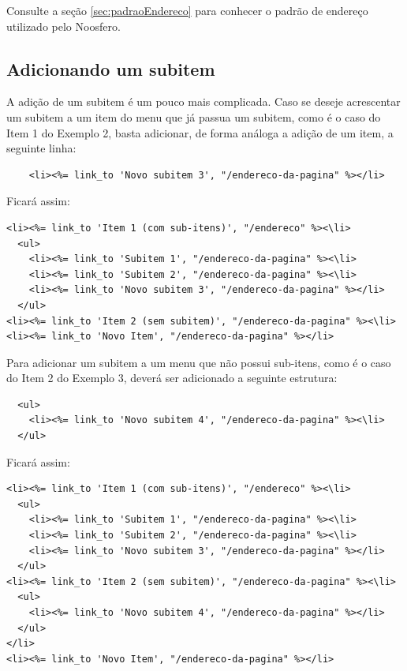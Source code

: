 Consulte a seção \ref{sec:padraoEndereco} para conhecer o padrão de endereço utilizado pelo Noosfero.

\subsection{Adicionando um subitem}

A adição de um subitem é um pouco mais complicada. Caso se deseje acrescentar um subitem a um item do menu que já passua um subitem, como é o caso do Item 1 do Exemplo 2, basta adicionar, de forma análoga a adição de um item, a seguinte linha:

\begin{verbatim}
    <li><%= link_to 'Novo subitem 3', "/endereco-da-pagina" %></li>
\end{verbatim}

\newpage
Ficará assim:

\begin{verbatim}
<li><%= link_to 'Item 1 (com sub-itens)', "/endereco" %><\li>
  <ul>
    <li><%= link_to 'Subitem 1', "/endereco-da-pagina" %><\li>
    <li><%= link_to 'Subitem 2', "/endereco-da-pagina" %><\li>
    <li><%= link_to 'Novo subitem 3', "/endereco-da-pagina" %></li>
  </ul>
<li><%= link_to 'Item 2 (sem subitem)', "/endereco-da-pagina" %><\li>
<li><%= link_to 'Novo Item', "/endereco-da-pagina" %></li>
\end{verbatim}

Para adicionar um subitem a um menu que não possui sub-itens, como é o caso do Item 2 do Exemplo 3, deverá ser adicionado a seguinte estrutura:

\begin{verbatim}
  <ul>
    <li><%= link_to 'Novo subitem 4', "/endereco-da-pagina" %><\li>
  </ul>
\end{verbatim}

Ficará assim:

\begin{verbatim}
<li><%= link_to 'Item 1 (com sub-itens)', "/endereco" %><\li>
  <ul>
    <li><%= link_to 'Subitem 1', "/endereco-da-pagina" %><\li>
    <li><%= link_to 'Subitem 2', "/endereco-da-pagina" %><\li>
    <li><%= link_to 'Novo subitem 3', "/endereco-da-pagina" %></li>
  </ul>
<li><%= link_to 'Item 2 (sem subitem)', "/endereco-da-pagina" %><\li>
  <ul>
    <li><%= link_to 'Novo subitem 4', "/endereco-da-pagina" %></li>
  </ul>
</li>
<li><%= link_to 'Novo Item', "/endereco-da-pagina" %></li>
\end{verbatim}

